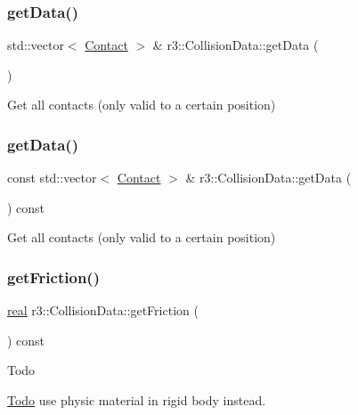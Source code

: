 \subsubsection{\texorpdfstring{get\+Data()}{getData()}\hspace{0.1cm}{\footnotesize\ttfamily [1/2]}}
{\footnotesize\ttfamily std\+::vector$<$ \mbox{\hyperlink{classr3_1_1_contact}{Contact}} $>$ \& r3\+::\+Collision\+Data\+::get\+Data (\begin{DoxyParamCaption}{ }\end{DoxyParamCaption})}

Get all contacts (only valid to a certain position) \mbox{\label{classr3_1_1_collision_data_ab31745ebb708c1d04e22bcfb385e663f}} 
\subsubsection{\texorpdfstring{get\+Data()}{getData()}\hspace{0.1cm}{\footnotesize\ttfamily [2/2]}}
{\footnotesize\ttfamily const std\+::vector$<$ \mbox{\hyperlink{classr3_1_1_contact}{Contact}} $>$ \& r3\+::\+Collision\+Data\+::get\+Data (\begin{DoxyParamCaption}{ }\end{DoxyParamCaption}) const}

Get all contacts (only valid to a certain position) \mbox{\label{classr3_1_1_collision_data_ae610a57c20c504a7bacb4e35f89f530f}} 
\subsubsection{\texorpdfstring{get\+Friction()}{getFriction()}}
{\footnotesize\ttfamily \mbox{\hyperlink{namespacer3_ab2016b3e3f743fb735afce242f0dc1eb}{real}} r3\+::\+Collision\+Data\+::get\+Friction (\begin{DoxyParamCaption}{ }\end{DoxyParamCaption}) const\hspace{0.3cm}{\ttfamily [inline]}}

\begin{DoxyRefDesc}{Todo}
\item[\mbox{\hyperlink{todo__todo000002}{Todo}}]use physic material in rigid body instead. \end{DoxyRefDesc}
\mbox{\label{classr3_1_1_collision_data_a4fa1a70757353fe8ae2facc3762f5b2b}} 
